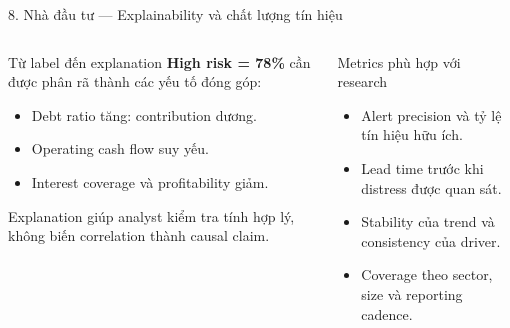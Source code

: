 \documentclass[aspectratio=169,11pt]{beamer}
\begin{document}
\begin{frame}{8. Nhà đầu tư — Explainability và chất lượng tín hiệu}
  \scriptsize
  \begin{columns}[T,totalwidth=\textwidth]
      \begin{exampleblock}{Từ label đến explanation}
        \textbf{High risk = 78\%} cần được phân rã thành các yếu tố đóng góp:
        \begin{itemize}
          \item Debt ratio tăng: contribution dương.
          \item Operating cash flow suy yếu.
          \item Interest coverage và profitability giảm.
        \end{itemize}
        Explanation giúp analyst kiểm tra tính hợp lý, không biến correlation thành causal claim.
      \end{exampleblock}
      \begin{block}{Metrics phù hợp với research}
        \begin{itemize}
          \item Alert precision và tỷ lệ tín hiệu hữu ích.
          \item Lead time trước khi distress được quan sát.
          \item Stability của trend và consistency của driver.
          \item Coverage theo sector, size và reporting cadence.
        \end{itemize}
      \end{block}
  \end{columns}
\end{frame}
\end{document}
